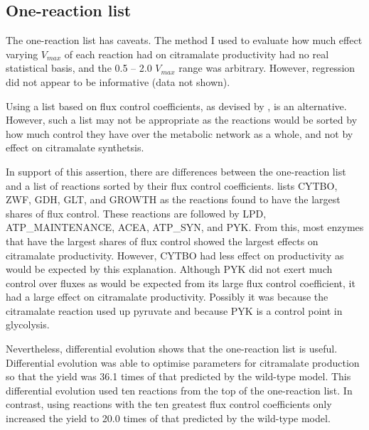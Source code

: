 \documentclass[parskip=full, numbers=noenddot]{scrreprt}
\begin{document}
\subsection{One-reaction list}
\label{ssec:discussion-kinetic-onereaction}

The one-reaction list has caveats. The method I used to evaluate how much effect varying $V_{max}$ of each reaction had on citramalate productivity had no real statistical basis, and the 0.5 -- 2.0 $V_{max}$ range was arbitrary. However, regression did not appear to be informative (data not shown).

Using a list based on flux control coefficients, as devised by \citet{millard_metabolic_2017}, is an alternative. However, such a list may not be appropriate as the reactions would be sorted by how much control they have over the metabolic network as a whole, and not by effect on citramalate synthetsis.

In support of this assertion, there are differences between the one-reaction list and a list of reactions sorted by their flux control coefficients.
\citet{millard_metabolic_2017} lists CYTBO, ZWF, GDH, GLT, and GROWTH as the reactions found to have the largest shares of flux control. These reactions are followed by LPD, ATP\_MAINTENANCE, ACEA, ATP\_SYN, and PYK. From this, most enzymes that have the largest shares of flux control showed the largest effects on citramalate productivity. However, CYTBO had less effect on productivity as would be expected by this explanation. Although PYK did not exert much control over fluxes as would be expected from its large flux control coefficient, it had a large effect on citramalate productivity. Possibly it was because the citramalate reaction used up pyruvate and because PYK is a control point in glycolysis.

Nevertheless, differential evolution shows that the one-reaction list is useful.
Differential evolution was able to optimise parameters for citramalate production so that the yield was 36.1 times of that predicted by the wild-type model. This differential evolution used ten reactions from the top of the one-reaction list. In contrast, using reactions with the ten greatest flux control coefficients only increased the yield to 20.0 times of that predicted by the wild-type model.
\end{document}
